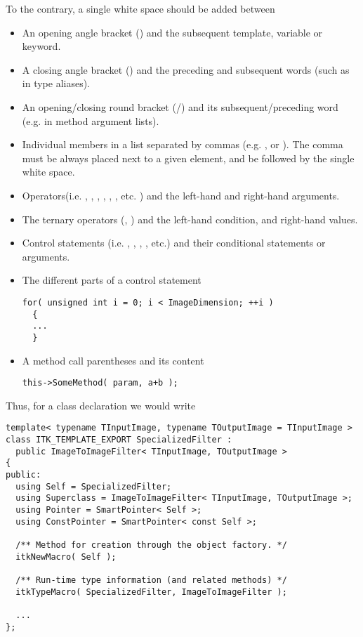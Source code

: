 To the contrary, a single white space should be added between
\begin{itemize}
\item An opening angle bracket (\code{<}) and the subsequent template,
variable or keyword.
\item A closing angle bracket (\code{>}) and the preceding and subsequent
words (such as in type aliases).
\item An opening/closing round bracket (\code{(}/\code{)}) and its
subsequent/preceding word (e.g. in method argument lists).
\item Individual members in a list separated by commas (e.g.
, or ). The comma must be
always placed next to a given element, and be followed by the single white space.
\item Operators(i.e. \code{+}, \code{-}, \code{=}, \code{==}, \code{+=},
\code{<<}, etc. ) and the left-hand and right-hand arguments.
\item The ternary operators (, \code{:}) and the left-hand condition,
and right-hand values.
\item Control statements (i.e. , , ,
, etc.) and their conditional statements or arguments.
\item The different parts of a  control statement

\small
\begin{verbatim}
for( unsigned int i = 0; i < ImageDimension; ++i )
  {
  ...
  }
\end{verbatim}
\normalsize

\item A method call parentheses and its content

\small
\begin{verbatim}
this->SomeMethod( param, a+b );
\end{verbatim}
\normalsize

\end{itemize}

Thus, for a class declaration we would write

\small
\begin{verbatim}
template< typename TInputImage, typename TOutputImage = TInputImage >
class ITK_TEMPLATE_EXPORT SpecializedFilter :
  public ImageToImageFilter< TInputImage, TOutputImage >
{
public:
  using Self = SpecializedFilter;
  using Superclass = ImageToImageFilter< TInputImage, TOutputImage >;
  using Pointer = SmartPointer< Self >;
  using ConstPointer = SmartPointer< const Self >;

  /** Method for creation through the object factory. */
  itkNewMacro( Self );

  /** Run-time type information (and related methods) */
  itkTypeMacro( SpecializedFilter, ImageToImageFilter );

  ...
};
\end{verbatim}
\normalsize

